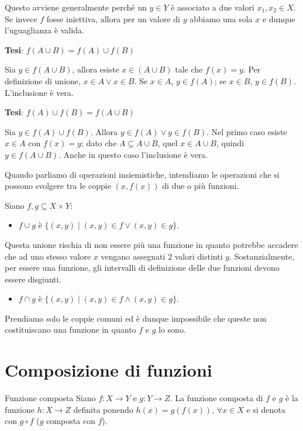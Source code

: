 \documentclass[12pt]{report}
\begin{document}
	Questo avviene generalmente perché un $y \in Y$ è associato a due valori $x_1, x_2 \in X$. Se invece $f$ fosse iniettiva, allora per un valore di $y$ abbiamo una sola $x$ e dunque l'uguaglianza è valida.
	
	\begin{dimostrazione}{}{}
		\textbf{Tesi}: $f(A \cup B) = f(A) \cup f(B)$
		
		\smallbreak
		Sia $y \in f(A \cup B)$, allora esiste $x \in (A \cup B)$ tale che $f(x) = y$. Per definizione di unione, $x \in A \lor x \in B$. Se $x \in A$, $y \in f(A)$; se $x \in B$, $y \in f(B)$. L'inclusione è vera.
		
		\smallbreak
		\textbf{Tesi}: $f(A) \cup f(B) = f(A \cup B)$
		
		\smallbreak
		Sia $y \in f(A) \cup f(B)$. Allora $y \in f(A) \lor y \in f(B)$. Nel primo caso esiste $x \in A$ con $f(x) = y$; dato che $A \subseteq A \cup B$, quel $x \in A \cup B$, quindi $y \in f(A \cup B)$. Anche in questo caso l'inclusione è vera.
	\end{dimostrazione}
	
	Quando parliamo di operazioni insiemistiche, intendiamo le operazioni che si possono svolgere tra le coppie $(x, f(x))$ di due o più funzioni.
	
	Siano $f, g \subseteq X \times Y$:
	\begin{itemize}
		\item $f \cup g$ è $\{(x, y) \mid (x, y) \in f \lor (x, y) \in g\}$.
	\end{itemize}
	Questa unione rischia di non essere più una funzione in quanto potrebbe accadere che ad uno stesso valore $x$ vengano assegnati $2$ valori distinti $y$. Sostanzialmente, per essere una funzione, gli intervalli di definizione delle due funzioni devono essere disgiunti.
	
	\begin{itemize}
		\item $f \cap g$ è $\{(x, y) \mid (x, y) \in f \land (x, y) \in g\}$.
	\end{itemize}
	Prendiamo solo le coppie comuni ed è dunque impossibile che queste non costituiscano una funzione in quanto $f$ e $g$ lo sono.
	
	\section{Composizione di funzioni}
	
	\begin{definizione}{Funzione composta}{}
		Siano $f: X \to Y$ e $g: Y \to Z$. La funzione composta di $f$ e $g$ è la funzione $h: X \to Z$ definita ponendo $h(x) = g(f(x)),\, \forall x \in X$ e si denota con $g \circ f$ ($g$ composta con $f$).
	\end{definizione}
	
\end{document}
